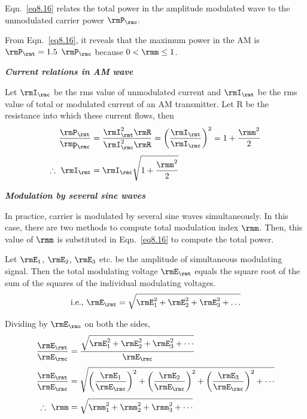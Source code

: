 Eqn.~\eqref{eq8.16} relates the total power in the amplitude modulated
wave to the unmodulated carrier power $\rmP_\rmc.$

From Eqn.~\eqref{eq8.16}, it reveals that the maximum power in the AM
is $\rmP_\rmt = 1.5$ $\rmP_\rmc$ because $0< \rmm \leq 1$.

\eject

\noindent
{\textit{\textbf{Current relations in AM wave}}}

Let $\rmI_\rmc$ be the rms value of unmodulated current and $\rmI_\rmt$ be
the rms value of total or modulated current of an AM transmitter. Let
R be the resistance into which these current flows, then
\begin{align}
\frac{\rmP_\rmt}{\rmp_\rmc} &= \frac{\rmI_\rmt^2 \rmR}{\rmI^2_\rmc \rmR}
= \left(\frac{\rmI_\rmt}{\rmI_\rmc} \right)^2 = 1 + \frac{\rmm^2}{2}\notag\\[3pt]
\therefore ~ \rmI_\rmt & = \rmI_\rmc \sqrt{1+ \frac{\rmm^2}{2}}\label{eq8.17}
\end{align}

\medskip
\noindent
{\textit{\textbf{Modulation by several sine waves}}}

In practice, carrier is modulated by several sine waves
simultaneously. In this case, there are two methods to compute total
modulation index $\rmm$. Then, this value of $\rmm$ is substituted in
Eqn.~\eqref{eq8.16} to compute the total power.


\begin{method}%
Let $\rmE_1$, $\rmE_2$, $\rmE_3$ etc. be the amplitude of simultaneous
modulating signal. Then the total modulating voltage $\rmE_\rmt$ equals the
square root of the sum of the squares of the individual modulating
voltages.
\begin{equation}
\text{i.e., } \rmE_\rmt =\sqrt{\rmE^2_1 + \rmE^2_2 + \rmE^2_3 + \ldots} \label{eq8.18}
\end{equation}

Dividing by $\rmE_\rmc$ on both the sides,
\begin{align}
\frac{\rmE_\rmt}{\rmE_\rmc} & = \frac{\sqrt{\rmE^2_1 + \rmE^2_2 + \rmE^2_3 + \cdots}}{\rmE_\rmc}\notag\\[3pt]
\frac{\rmE_\rmt}{\rmE_\rmc} & = \sqrt{\left(\frac{\rmE_1}{\rmE_\rmc} \right)^2 + \left(\frac{\rmE_2}{\rmE_\rmc} \right)^2
+ \left(\frac{\rmE_3}{\rmE_\rmc} \right)^2 + \cdots}\notag\\[3pt]
\therefore ~ \rmm & =  \sqrt{\rmm^2_1 + \rmm^2_2 + \rmm_3^2 + \cdots } \label{eq8.19}
\end{align}
\end{method}


